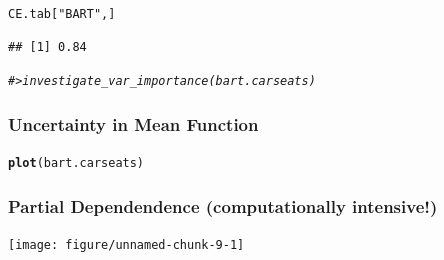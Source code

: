 \documentclass[]{beamer}\usepackage[]{graphicx}\usepackage[]{color}
\makeatletter
\newcommand{\hlstr}[1]{\textcolor[rgb]{0.192,0.494,0.8}{#1}}%
\newcommand{\hlcom}[1]{\textcolor[rgb]{0.678,0.584,0.686}{\textit{#1}}}%
\newcommand{\hlstd}[1]{\textcolor[rgb]{0.345,0.345,0.345}{#1}}%
\newcommand{\hlkwd}[1]{\textcolor[rgb]{0.737,0.353,0.396}{\textbf{#1}}}%
\newenvironment{kframe}{%
 \def\at@end@of@kframe{}%
 \ifinner\ifhmode%
  \def\at@end@of@kframe{\end{minipage}}%
  \begin{minipage}{\columnwidth}%
 \fi\fi%
 \def\FrameCommand##1{\hskip\@totalleftmargin \hskip-\fboxsep
 \colorbox{shadecolor}{##1}\hskip-\fboxsep
     \hskip-\linewidth \hskip-\@totalleftmargin \hskip\columnwidth}%
 \MakeFramed {\advance\hsize-\width
   \@totalleftmargin\z@ \linewidth\hsize
   \@setminipage}}%
 {\par\unskip\endMakeFramed%
 \at@end@of@kframe}
\newenvironment{knitrout}{}{} %
\makeatother
\begin{document}
\begin{frame}[fragile]
\begin{knitrout}
\begin{kframe}
\begin{alltt}
\hlstd{CE.tab[}\hlstr{"BART"}\hlstd{,]}
\end{alltt}
\begin{verbatim}
## [1] 0.84
\end{verbatim}
\begin{alltt}
\hlcom{#> investigate_var_importance(bart.carseats)}
\end{alltt}
\end{kframe}
\end{knitrout}
\end{frame}

\begin{frame} \frametitle{Uncertainty in Mean Function}
\begin{knitrout}
\color{fgcolor}\begin{kframe}
\begin{alltt}
\hlkwd{plot}\hlstd{(bart.carseats)}
\end{alltt}


{\ttfamily\noindent\bfseries\color{errorcolor}{\#\# Error in plot(bart.carseats): object 'bart.carseats' not found}}\end{kframe}
\end{knitrout}
\end{frame}

\begin{frame}[fragile] \frametitle{Partial Dependendence (computationally intensive!)}
\begin{knitrout}
\color{fgcolor}

{\centering \texttt{[image: figure/unnamed-chunk-9-1]} 

}



\end{knitrout}

\end{frame}
\end{document}
